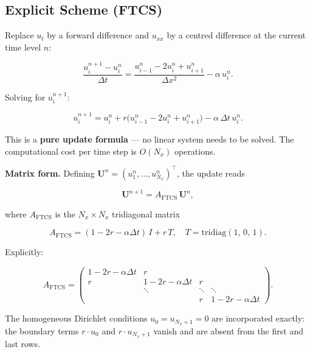 \documentclass[11pt,a4paper]{article}
\begin{document}
\subsection{Explicit Scheme (FTCS)}

Replace $u_t$ by a forward difference and $u_{xx}$ by a centred difference at the current time level $n$:

\begin{equation}
\frac{u_i^{n+1} - u_i^n}{\Delta t} = \frac{u_{i-1}^n - 2u_i^n + u_{i+1}^n}{\Delta x^2} - \alpha\, u_i^n. \tag{24}
\end{equation}

Solving for $u_i^{n+1}$:

\begin{equation}
u_i^{n+1} = u_i^n + r\bigl(u_{i-1}^n - 2u_i^n + u_{i+1}^n\bigr) - \alpha\,\Delta t\, u_i^n. \tag{25}
\end{equation}

This is a \textbf{pure update formula} — no linear system needs to be solved. The computational cost per time step is $O(N_x)$ operations.

\textbf{Matrix form.} Defining $\mathbf{U}^n = (u_1^n, \ldots, u_{N_x}^n)^\top$, the update reads

\begin{equation}
\mathbf{U}^{n+1} = A_{\text{FTCS}}\,\mathbf{U}^n, \tag{26}
\end{equation}

where $A_{\text{FTCS}}$ is the $N_x \times N_x$ tridiagonal matrix

\begin{equation}
A_{\text{FTCS}} = (1 - 2r - \alpha\Delta t)\,I + r\,T, \quad T = \mathrm{tridiag}(1,\,0,\,1). \tag{27}
\end{equation}

Explicitly:

\begin{equation}
A_{\text{FTCS}} =
\begin{pmatrix} 1-2r-\alpha\Delta t & r & & \\ r & 1-2r-\alpha\Delta t & r & \\ & \ddots & \ddots & \ddots \\ & & r & 1-2r-\alpha\Delta t
\end{pmatrix}. \tag{28}
\end{equation}

The homogeneous Dirichlet conditions $u_0=u_{N_x+1}=0$ are incorporated exactly: the boundary terms $r\cdot u_0$ and $r\cdot u_{N_x+1}$ vanish and are absent from the first and last rows.
\end{document}
